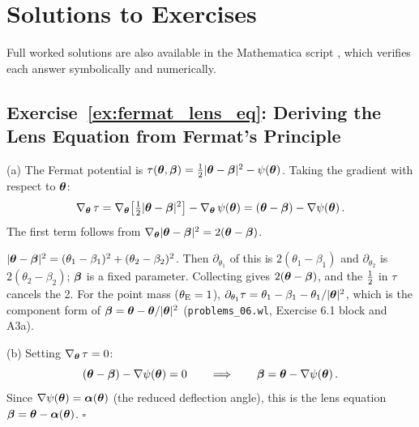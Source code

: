 
\section{Solutions to Exercises}
\label{sec:fermat_solutions}

\noindent
Full worked solutions are also available in the Mathematica script
,
which verifies each answer symbolically and numerically.

\subsection*{Exercise~\ref{ex:fermat_lens_eq}: Deriving the Lens Equation from Fermat's Principle}

(a) The Fermat potential is
$\tau(\boldsymbol{\theta}, \boldsymbol{\beta}) = \tfrac{1}{2}|\boldsymbol{\theta} - \boldsymbol{\beta}|^2
- \psi(\boldsymbol{\theta})$.  Taking the gradient with respect to $\boldsymbol{\theta}$:
\begin{equation*}
    \nabla_{\boldsymbol{\theta}}\,\tau
    = \nabla_{\boldsymbol{\theta}}\!\left[\tfrac{1}{2}|\boldsymbol{\theta} - \boldsymbol{\beta}|^2\right]
    - \nabla_{\boldsymbol{\theta}}\,\psi(\boldsymbol{\theta})
    = (\boldsymbol{\theta} - \boldsymbol{\beta}) - \nabla\psi(\boldsymbol{\theta}) \,.
\end{equation*}
The first term follows from
$\nabla_{\boldsymbol{\theta}}|\boldsymbol{\theta} - \boldsymbol{\beta}|^2 = 2(\boldsymbol{\theta} - \boldsymbol{\beta})$.

\begin{derivation}
$|\boldsymbol{\theta}-\boldsymbol{\beta}|^2 = (\theta_1-\beta_1)^2+(\theta_2-\beta_2)^2$.  Then
$\partial_{\theta_1}$ of this is $2(\theta_1-\beta_1)$ and $\partial_{\theta_2}$ is
$2(\theta_2-\beta_2)$; $\boldsymbol{\beta}$ is a fixed parameter.  Collecting gives
$2(\boldsymbol{\theta}-\boldsymbol{\beta})$, and the $\tfrac{1}{2}$ in $\tau$ cancels the 2.  For the
point mass ($\theta_{\mathrm{E}}=1$), $\partial_{\theta_1}\tau = \theta_1-\beta_1-\theta_1/|\boldsymbol{\theta}|^2$,
which is the component form of $\boldsymbol{\beta} = \boldsymbol{\theta}-\boldsymbol{\theta}/|\boldsymbol{\theta}|^2$
(\texttt{problems\_06.wl}, Exercise 6.1 block and A3a).
\end{derivation}

(b) Setting $\nabla_{\boldsymbol{\theta}}\,\tau = 0$:
\begin{equation*}
    (\boldsymbol{\theta} - \boldsymbol{\beta}) - \nabla\psi(\boldsymbol{\theta}) = 0
    \qquad \Longrightarrow \qquad
    \boldsymbol{\beta} = \boldsymbol{\theta} - \nabla\psi(\boldsymbol{\theta}) \,.
\end{equation*}
Since $\nabla\psi(\boldsymbol{\theta}) = \boldsymbol{\alpha}(\boldsymbol{\theta})$ (the reduced
deflection angle), this is the lens equation
$\boldsymbol{\beta} = \boldsymbol{\theta} - \boldsymbol{\alpha}(\boldsymbol{\theta})$.  \hfill $\square$

